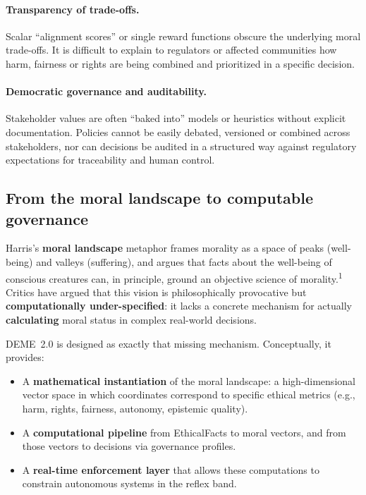 \documentclass[11pt]{article}
\begin{document}
\paragraph{Transparency of trade-offs.}
Scalar ``alignment scores'' or single reward functions obscure the underlying moral trade-offs. It is difficult to explain to regulators or affected communities how harm, fairness or rights are being combined and prioritized in a specific decision.

\paragraph{Democratic governance and auditability.}
Stakeholder values are often ``baked into'' models or heuristics without explicit documentation. Policies cannot be easily debated, versioned or combined across stakeholders, nor can decisions be audited in a structured way against regulatory expectations for traceability and human control.

\subsection{From the moral landscape to computable governance}

Harris's \textbf{moral landscape} metaphor frames morality as a space of peaks (well-being) and valleys (suffering), and argues that facts about the well-being of conscious creatures can, in principle, ground an objective science of morality.\textsuperscript{1} Critics have argued that this vision is philosophically provocative but \textbf{computationally under-specified}: it lacks a concrete mechanism for actually \textbf{calculating} moral status in complex real-world decisions.

DEME~2.0 is designed as exactly that missing mechanism. Conceptually, it provides:

\begin{itemize}
  \item A \textbf{mathematical instantiation} of the moral landscape: a high-dimensional vector space in which coordinates correspond to specific ethical metrics (e.g., harm, rights, fairness, autonomy, epistemic quality).
  \item A \textbf{computational pipeline} from EthicalFacts to moral vectors, and from those vectors to decisions via governance profiles.
  \item A \textbf{real-time enforcement layer} that allows these computations to constrain autonomous systems in the reflex band.
\end{itemize}
\end{document}
